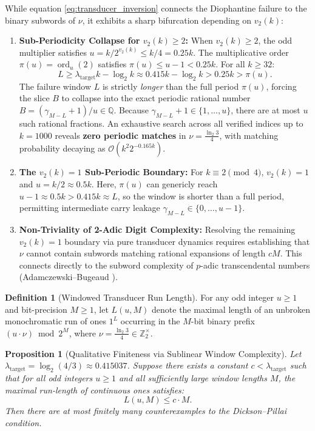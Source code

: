 \documentclass[11pt,reqno]{amsart}
\newtheorem{proposition}[theorem]{Proposition}
\theoremstyle{definition}
\newtheorem{definition}[theorem]{Definition}
\numberwithin{equation}{section}
\begin{document}
While equation \eqref{eq:transducer_inversion} connects the Diophantine failure to the binary subwords of $\nu$, it exhibits a sharp bifurcation depending on $v_2(k)$:
\begin{enumerate}
    \item \textbf{Sub-Periodicity Collapse for $v_2(k) \ge 2$:} When $v_2(k) \ge 2$, the odd multiplier satisfies $u = k / 2^{v_2(k)} \le k / 4 = 0.25 k$. The multiplicative order $\pi(u) = \operatorname{ord}_u(2)$ satisfies $\pi(u) \le u - 1 < 0.25 k$. For all $k \ge 32$:
    \[
    L \ge \lambda_{\mathrm{target}} k - \log_2 k \approx 0.415 k - \log_2 k > 0.25 k > \pi(u).
    \]
    The failure window $L$ is strictly \emph{longer} than the full period $\pi(u)$, forcing the slice $B$ to collapse into the exact periodic rational number $B = (\gamma_{M-L} + 1)/u \in \mathbb{Q}$. Because $\gamma_{M-L} + 1 \in \{1, \dots, u\}$, there are at most $u$ such rational fractions. An exhaustive search across all verified indices up to $k = 1000$ reveals \textbf{zero periodic matches} in $\nu = \frac{\ln_2 3}{4}$, with matching probability decaying as $\mathcal{O}(k^2 2^{-0.165 k})$.
    \item \textbf{The $v_2(k) = 1$ Sub-Periodic Boundary:} For $k \equiv 2 \pmod 4$, $v_2(k) = 1$ and $u = k / 2 \approx 0.5 k$. Here, $\pi(u)$ can genericly reach $u - 1 \approx 0.5 k > 0.415 k \approx L$, so the window is shorter than a full period, permitting intermediate carry leakage $\gamma_{M-L} \in \{0, \dots, u-1\}$.
    \item \textbf{Non-Triviality of 2-Adic Digit Complexity:} Resolving the remaining $v_2(k) = 1$ boundary via pure transducer dynamics requires establishing that $\nu$ cannot contain subwords matching rational expansions of length $c M$. This connects directly to the subword complexity of $p$-adic transcendental numbers (Adamczewski--Bugeaud \cite{adamczewski2007}).
\end{enumerate}

\begin{definition}[Windowed Transducer Run Length]
For any odd integer $u \ge 1$ and bit-precision $M \ge 1$, let $L(u, M)$ denote the maximal length of an unbroken monochromatic run of ones $1^L$ occurring in the $M$-bit binary prefix $(u \cdot \nu) \bmod 2^M$, where $\nu = \frac{\ln_2 3}{4} \in \mathbb{Z}_2^\times$.
\end{definition}

\begin{proposition}[Qualitative Finiteness via Sublinear Window Complexity]\label{prop:qualitative_finiteness}
Let $\lambda_{\mathrm{target}} = \log_2(4/3) \approx 0.415037$. Suppose there exists a constant $c < \lambda_{\mathrm{target}}$ such that for all odd integers $u \ge 1$ and all sufficiently large window lengths $M$, the maximal run-length of continuous ones satisfies:
\begin{equation}\label{eq:window_complexity_bound}
L(u, M) \le c \cdot M.
\end{equation}
Then there are at most finitely many counterexamples to the Dickson--Pillai condition.
\end{proposition}
\end{document}
